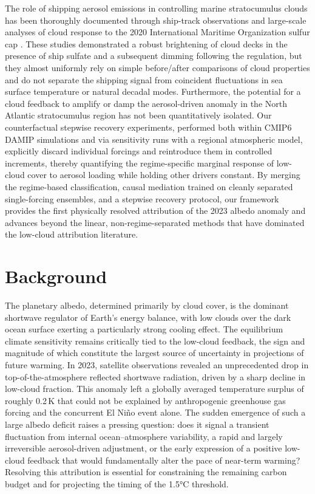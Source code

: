 \documentclass{article}
\begin{document}
The role of shipping aerosol emissions in controlling marine stratocumulus clouds has been thoroughly documented through ship-track observations \cite{christensen2010ship,goren2014satellite} and large-scale analyses of cloud response to the 2020 International Maritime Organization sulfur cap \cite{diamond2023impact,yuan2022observed}. These studies demonstrated a robust brightening of cloud decks in the presence of ship sulfate and a subsequent dimming following the regulation, but they almost uniformly rely on simple before/after comparisons of cloud properties and do not separate the shipping signal from coincident fluctuations in sea surface temperature or natural decadal modes. Furthermore, the potential for a cloud feedback to amplify or damp the aerosol-driven anomaly in the North Atlantic stratocumulus region has not been quantitatively isolated. Our counterfactual stepwise recovery experiments, performed both within CMIP6 DAMIP simulations and via sensitivity runs with a regional atmospheric model, explicitly discard individual forcings and reintroduce them in controlled increments, thereby quantifying the regime-specific marginal response of low-cloud cover to aerosol loading while holding other drivers constant. By merging the regime-based classification, causal mediation trained on cleanly separated single-forcing ensembles, and a stepwise recovery protocol, our framework provides the first physically resolved attribution of the 2023 albedo anomaly and advances beyond the linear, non-regime-separated methods that have dominated the low-cloud attribution literature.

\section{Background}
The planetary albedo, determined primarily by cloud cover, is the dominant shortwave regulator of Earth's energy balance, with low clouds over the dark ocean surface exerting a particularly strong cooling effect. The equilibrium climate sensitivity remains critically tied to the low-cloud feedback, the sign and magnitude of which constitute the largest source of uncertainty in projections of future warming. In 2023, satellite observations revealed an unprecedented drop in top-of-the-atmosphere reflected shortwave radiation, driven by a sharp decline in low-cloud fraction. This anomaly left a globally averaged temperature surplus of roughly 0.2\,K that could not be explained by anthropogenic greenhouse gas forcing and the concurrent El Niño event alone. The sudden emergence of such a large albedo deficit raises a pressing question: does it signal a transient fluctuation from internal ocean–atmosphere variability, a rapid and largely irreversible aerosol-driven adjustment, or the early expression of a positive low-cloud feedback that would fundamentally alter the pace of near-term warming? Resolving this attribution is essential for constraining the remaining carbon budget and for projecting the timing of the 1.5°C threshold.
\end{document}
